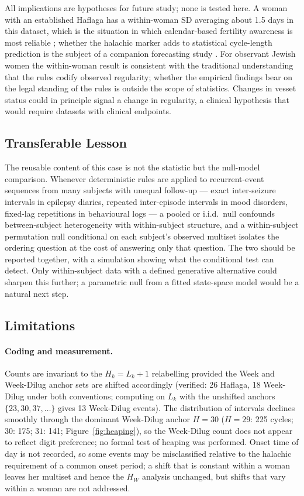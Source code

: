 \documentclass[12pt]{article}
\newcommand{\HW}{H_{W}}
\begin{document}
All implications are hypotheses for future study; none is tested here. A woman with an
established Haflaga has a within-woman SD averaging about 1.5 days in this dataset, which is
the situation in which calendar-based fertility awareness is most reliable
\citep{bortot2010}; whether the halachic marker adds to statistical cycle-length
prediction is the subject of a companion forecasting study \citep{ross_planned}. For
observant Jewish women the within-woman result is consistent with the traditional
understanding that the rules codify observed regularity; whether the empirical findings
bear on the legal standing of the rules is outside the scope of statistics. Changes in
vesset status could in principle signal a change in regularity, a clinical hypothesis
that would require datasets with clinical endpoints.

\subsection{Transferable Lesson}

The reusable content of this case is not the statistic but the null-model comparison.
Whenever deterministic rules are applied to recurrent-event sequences from many subjects
with unequal follow-up --- exact inter-seizure intervals in epilepsy diaries, repeated
inter-episode intervals in mood disorders, fixed-lag repetitions in behavioural logs ---
a pooled or i.i.d.\ null confounds between-subject heterogeneity with within-subject
structure, and a within-subject permutation null conditional on each subject's observed
multiset isolates the ordering question at the cost of answering only that question. The
two should be reported together, with a simulation showing what the conditional test can
detect. Only within-subject data with a defined generative alternative could sharpen this
further; a parametric null from a fitted state-space model \citep{bortot2010} would be a
natural next step.

\subsection{Limitations}
\label{sec:limitations}

\paragraph{Coding and measurement.}
Counts are invariant to the $H_k = L_k + 1$ relabelling provided the Week and Week-Dilug
anchor sets are shifted accordingly (verified: 26 Haflaga, 18 Week-Dilug under both
conventions; computing on $L_k$ with the unshifted anchors $\{23, 30, 37, \ldots\}$ gives
13 Week-Dilug events). The
distribution of intervals declines smoothly through the dominant Week-Dilug anchor $H = 30$ ($H = 29$: 225 cycles;
$30$: 175; $31$: 141; Figure~\ref{fig:heaping}), so the Week-Dilug count does not appear
to reflect digit preference; no formal test of heaping was performed. Onset time of day
is not recorded, so some events may be misclassified relative to the halachic requirement
of a common onset period; a shift that is constant within a woman leaves her multiset and
hence the $\HW$ analysis unchanged, but shifts that vary within a woman are not
addressed.
\end{document}
